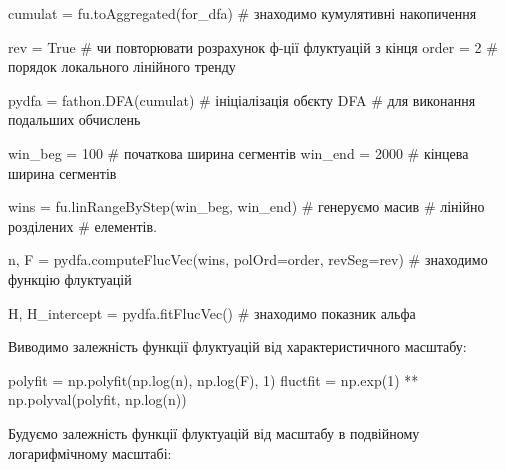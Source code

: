 \documentclass[
  letterpaper,
]{report}
\newenvironment{Shaded}{\begin{snugshade}}{\end{snugshade}}
\newcommand{\CommentTok}[1]{\textcolor[rgb]{0.37,0.37,0.37}{#1}}
\newcommand{\DecValTok}[1]{\textcolor[rgb]{0.68,0.00,0.00}{#1}}
\newcommand{\NormalTok}[1]{\textcolor[rgb]{0.00,0.23,0.31}{#1}}
\newcommand{\OperatorTok}[1]{\textcolor[rgb]{0.37,0.37,0.37}{#1}}
\newcommand{\VariableTok}[1]{\textcolor[rgb]{0.07,0.07,0.07}{#1}}
\begin{document}
\begin{Shaded}
\begin{Highlighting}[]
\NormalTok{cumulat }\OperatorTok{=}\NormalTok{ fu.toAggregated(for\_dfa) }\CommentTok{\# знаходимо кумулятивні накопичення}

\NormalTok{rev }\OperatorTok{=} \VariableTok{True} \CommentTok{\# чи повторювати розрахунок ф{-}ції флуктуацій з кінця}
\NormalTok{order }\OperatorTok{=} \DecValTok{2}  \CommentTok{\# порядок локального лінійного тренду }

\NormalTok{pydfa }\OperatorTok{=}\NormalTok{ fathon.DFA(cumulat) }\CommentTok{\# ініціалізація об\textquotesingle{}єкту DFA}
                            \CommentTok{\# для виконання подальших обчислень}

\NormalTok{win\_beg }\OperatorTok{=} \DecValTok{100}               \CommentTok{\# початкова ширина сегментів}
\NormalTok{win\_end }\OperatorTok{=} \DecValTok{2000}              \CommentTok{\# кінцева ширина сегментів}

\NormalTok{wins }\OperatorTok{=}\NormalTok{ fu.linRangeByStep(win\_beg, win\_end) }\CommentTok{\# генеруємо масив }
                                           \CommentTok{\# лінійно розділених }
                                           \CommentTok{\# елементів.}

\NormalTok{n, F }\OperatorTok{=}\NormalTok{ pydfa.computeFlucVec(wins, }
\NormalTok{                            polOrd}\OperatorTok{=}\NormalTok{order, }
\NormalTok{                            revSeg}\OperatorTok{=}\NormalTok{rev)    }\CommentTok{\# знаходимо функцію флуктуацій}

\NormalTok{H, H\_intercept }\OperatorTok{=}\NormalTok{ pydfa.fitFlucVec()        }\CommentTok{\# знаходимо показник альфа}
\end{Highlighting}
\end{Shaded}

Виводимо залежність функції флуктуацій від характеристичного масштабу:

\begin{Shaded}
\begin{Highlighting}[]
\NormalTok{polyfit }\OperatorTok{=}\NormalTok{ np.polyfit(np.log(n), np.log(F), }\DecValTok{1}\NormalTok{)}
\NormalTok{fluctfit }\OperatorTok{=}\NormalTok{ np.exp(}\DecValTok{1}\NormalTok{) }\OperatorTok{**}\NormalTok{ np.polyval(polyfit, np.log(n))}
\end{Highlighting}
\end{Shaded}

Будуємо залежність функції флуктуацій від масштабу в подвійному
логарифмічному масштабі:
\end{document}
